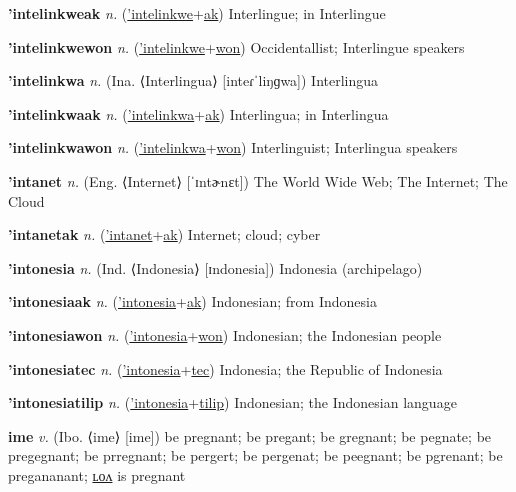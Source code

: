 \textbf{\hypertarget{'intelinkweak}{'intelinkweak}} \textit{n.} (\hyperlink{'intelinkwe}{'intelinkwe}+\allowbreak \hyperlink{ak}{ak})
Interlingue; in Interlingue

\textbf{\hypertarget{'intelinkwewon}{'intelinkwewon}} \textit{n.} (\hyperlink{'intelinkwe}{'intelinkwe}+\allowbreak \hyperlink{won}{won})
Occidentallist; Interlingue speakers

\textbf{\hypertarget{'intelinkwa}{'intelinkwa}} \textit{n.} (Ina. ⟨Interlingua⟩ [inteɾˈliŋɡwa])
Interlingua

\textbf{\hypertarget{'intelinkwaak}{'intelinkwaak}} \textit{n.} (\hyperlink{'intelinkwa}{'intelinkwa}+\allowbreak \hyperlink{ak}{ak})
Interlingua; in Interlingua

\textbf{\hypertarget{'intelinkwawon}{'intelinkwawon}} \textit{n.} (\hyperlink{'intelinkwa}{'intelinkwa}+\allowbreak \hyperlink{won}{won})
Interlinguist; Interlingua speakers

\textbf{\hypertarget{'intanet}{'intanet}} \textit{n.} (Eng. ⟨Internet⟩ [ˈɪntɚnɛt])
The World Wide Web; The Internet; The Cloud

\textbf{\hypertarget{'intanetak}{'intanetak}} \textit{n.} (\hyperlink{'intanet}{'intanet}+\allowbreak \hyperlink{ak}{ak})
Internet; cloud; cyber

\textbf{\hypertarget{'intonesia}{'intonesia}} \textit{n.} (Ind. ⟨Indonesia⟩ [ɪndonesia])
Indonesia (archipelago)

\textbf{\hypertarget{'intonesiaak}{'intonesiaak}} \textit{n.} (\hyperlink{'intonesia}{'intonesia}+\allowbreak \hyperlink{ak}{ak})
Indonesian; from Indonesia

\textbf{\hypertarget{'intonesiawon}{'intonesiawon}} \textit{n.} (\hyperlink{'intonesia}{'intonesia}+\allowbreak \hyperlink{won}{won})
Indonesian; the Indonesian people

\textbf{\hypertarget{'intonesiatec}{'intonesiatec}} \textit{n.} (\hyperlink{'intonesia}{'intonesia}+\allowbreak \hyperlink{tec}{tec})
Indonesia; the Republic of Indonesia

\textbf{\hypertarget{'intonesiatilip}{'intonesiatilip}} \textit{n.} (\hyperlink{'intonesia}{'intonesia}+\allowbreak \hyperlink{tilip}{tilip})
Indonesian; the Indonesian language

\textbf{\hypertarget{ime}{ime}} \textit{v.} (Ibo. ⟨ime⟩ [ime])
be pregnant; be pregant; be gregnant; be pegnate; be pregegnant; be prregnant; be pergert; be pergenat; be peegnant; be pgrenant; be pregananant; \hyperlink{imelon}{ʟᴏᴧ} is pregnant

